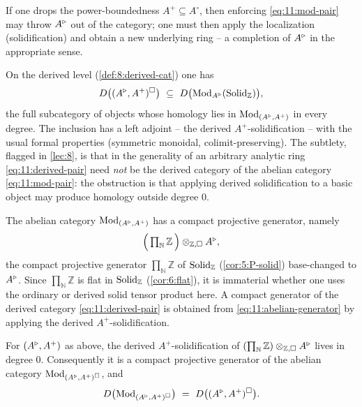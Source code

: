 \begin{remark}
\label{rmk:11:completion-aside}
If one drops the power-boundedness $A^{+}\subseteq A^{\circ}$, then enforcing
\eqref{eq:11:mod-pair} may throw $A^{\triangleright}$ out of the category; one must then apply
the localization (solidification) and obtain a new underlying ring -- a
completion of $A^{\triangleright}$ in the appropriate sense.
\end{remark}

On the derived level (\cref{def:8:derived-cat}) one has
\begin{equation}
\label{eq:11:derived-pair}
D\bigl((A^{\triangleright},A^{+})^{\square}\bigr)\ \subseteq\ D\bigl(\operatorname{Mod}_{A^{\triangleright}}(\mathrm{Solid}_{
\mathbb{Z}})\bigr),
\end{equation}
the full subcategory of objects whose homology lies in $\operatorname{Mod}_{(A^{\triangleright},A^{+})}$ in
every degree. The inclusion has a left adjoint -- the derived
$A^{+}$-solidification -- with the usual formal properties (symmetric
monoidal, colimit-preserving). The subtlety, flagged in \cref{lec:8}, is that
in the generality of an arbitrary analytic ring \eqref{eq:11:derived-pair} need
\emph{not} be the derived category of the abelian category
\eqref{eq:11:mod-pair}: the obstruction is that applying derived solidification
to a basic object may produce homology outside degree $0$.

The abelian category $\operatorname{Mod}_{(A^{\triangleright},A^{+})}$ has a compact projective generator,
namely
\begin{equation}
\label{eq:11:abelian-generator}
\Bigl(\,\textstyle\prod_{\mathbb{N}}\mathbb{Z}\,\Bigr)\otimes_{\mathbb{Z},\square}
A^{\triangleright},
\end{equation}
the compact projective generator $\prod_{\mathbb{N}}\mathbb{Z}$ of
$\mathrm{Solid}_{\mathbb{Z}}$ (\cref{cor:5:P-solid}) base-changed to $A^{\triangleright}$. Since
$\prod_{\mathbb{N}}\mathbb{Z}$ is flat in $\mathrm{Solid}_{\mathbb{Z}}$
(\cref{cor:6:flat}), it is immaterial whether one uses the ordinary or derived
solid tensor product here. A compact generator of the derived category
\eqref{eq:11:derived-pair} is obtained from \eqref{eq:11:abelian-generator} by
applying the derived $A^{+}$-solidification.

\begin{theorem}
\label{thm:11:degree-zero}
For $(A^{\triangleright},A^{+})$ as above, the derived $A^{+}$-solidification of
$(\prod_{\mathbb{N}}\mathbb{Z})\otimes_{\mathbb{Z},\square}A^{\triangleright}$ lives in degree
$0$. Consequently it is a compact projective generator of the abelian category
$\operatorname{Mod}_{(A^{\triangleright},A^{+})^{\square}}$, and
\begin{equation}
\label{eq:11:D-equals-Dheart}
D\bigl(\operatorname{Mod}_{(A^{\triangleright},A^{+})^{\square}}\bigr)\ =\ D\bigl((A^{\triangleright},A^{+})^{\square}
\bigr).
\end{equation}
\end{theorem}

